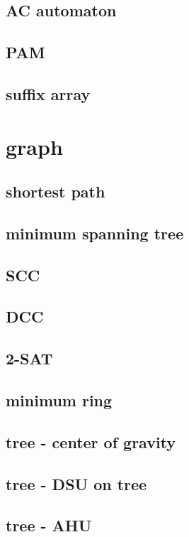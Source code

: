 \documentclass[UTF8, a4paper, titlepage, twoside]{ctexart}
\begin{document}
\subsection{AC automaton}

\subsection{PAM}


\subsection{suffix array}


\section{graph}
\subsection{shortest path}
\subsection{minimum spanning tree}
\subsection{SCC}
\subsection{DCC}
\subsection{2-SAT}
\subsection{minimum ring}
\subsection{tree - center of gravity}
\subsection{tree - DSU on tree}
\subsection{tree - AHU}
\end{document}
